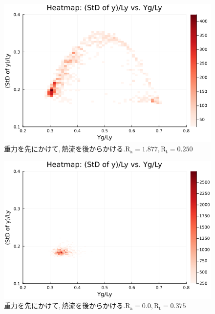 \begin{figure}[H]
  \centering
  \includegraphics[scale=0.6]{image/RaRtmap_drop_heat/2023-12-21T10:44:58.197_RaRtmap_chi1.265_Ay50_rho0.4_T0.43_dT0.04_Rd0.0_Rt0.25_Ra1.877538_g0.0003999718779659611_run4.0e7.png}
  \caption{$重力を先にかけて, 熱流を後からかける. \text{R}_\text{a}=1.877,\text{R}_\text{t}=0.250$}
  \label{}
\end{figure}

\begin{figure}[H]
  \centering
  \includegraphics[scale=0.6]{image/RaRtmap_drop_heat/2023-12-21T10:44:58.258_RaRtmap_chi1.265_Ay50_rho0.4_T0.43_dT0.04_Rd0.0_Rt0.375_Ra0.0_g0.0003999718779659611_run4.0e7.png}
  \caption{$重力を先にかけて, 熱流を後からかける. \text{R}_\text{a}=0.0,\text{R}_\text{t}=0.375$}
  \label{}
\end{figure}

